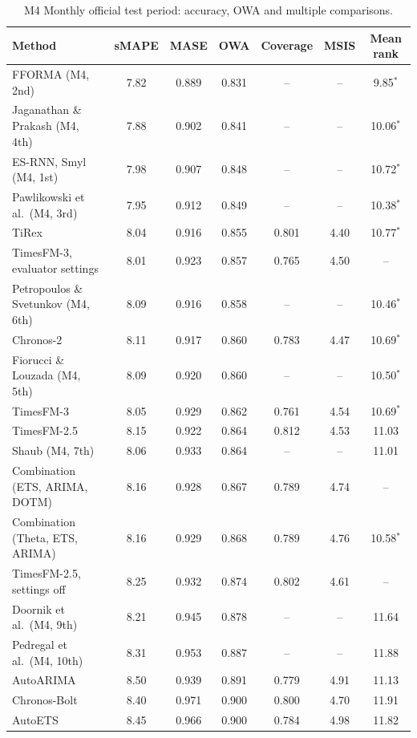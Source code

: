\begin{table}[!htbp]
\centering
\begin{threeparttable}
\caption{M4 Monthly official test period: accuracy, OWA and multiple comparisons.}
\label{tab:m4official}
\small\setlength{\tabcolsep}{4pt}
\begin{tabular}{lcccccc}
\toprule
Method & sMAPE & MASE & OWA & Coverage & MSIS & Mean rank \\
\midrule
FFORMA (M4, 2nd) & 7.82 & 0.889 & 0.831 & -- & -- & 9.85$^\ast$ \\
Jaganathan \& Prakash (M4, 4th) & 7.88 & 0.902 & 0.841 & -- & -- & 10.06$^\ast$ \\
ES-RNN, Smyl (M4, 1st) & 7.98 & 0.907 & 0.848 & -- & -- & 10.72$^\ast$ \\
Pawlikowski et al.\ (M4, 3rd) & 7.95 & 0.912 & 0.849 & -- & -- & 10.38$^\ast$ \\
TiRex & 8.04 & 0.916 & 0.855 & 0.801 & 4.40 & 10.77$^\ast$ \\
TimesFM-3, evaluator settings & 8.01 & 0.923 & 0.857 & 0.765 & 4.50 & -- \\
Petropoulos \& Svetunkov (M4, 6th) & 8.09 & 0.916 & 0.858 & -- & -- & 10.46$^\ast$ \\
Chronos-2 & 8.11 & 0.917 & 0.860 & 0.783 & 4.47 & 10.69$^\ast$ \\
Fiorucci \& Louzada (M4, 5th) & 8.09 & 0.920 & 0.860 & -- & -- & 10.50$^\ast$ \\
TimesFM-3 & 8.05 & 0.929 & 0.862 & 0.761 & 4.54 & 10.69$^\ast$ \\
TimesFM-2.5 & 8.15 & 0.922 & 0.864 & 0.812 & 4.53 & 11.03 \\
Shaub (M4, 7th) & 8.06 & 0.933 & 0.864 & -- & -- & 11.01 \\
Combination (ETS, ARIMA, DOTM) & 8.16 & 0.928 & 0.867 & 0.789 & 4.74 & -- \\
Combination (Theta, ETS, ARIMA) & 8.16 & 0.929 & 0.868 & 0.789 & 4.76 & 10.58$^\ast$ \\
TimesFM-2.5, settings off & 8.25 & 0.932 & 0.874 & 0.802 & 4.61 & -- \\
Doornik et al.\ (M4, 9th) & 8.21 & 0.945 & 0.878 & -- & -- & 11.64 \\
Pedregal et al.\ (M4, 10th) & 8.31 & 0.953 & 0.887 & -- & -- & 11.88 \\
AutoARIMA & 8.50 & 0.939 & 0.891 & 0.779 & 4.91 & 11.13 \\
Chronos-Bolt & 8.40 & 0.971 & 0.900 & 0.800 & 4.70 & 11.91 \\
AutoETS & 8.45 & 0.966 & 0.900 & 0.784 & 4.98 & 11.82 \\

\end{tabular}
\end{threeparttable}
\end{table}
